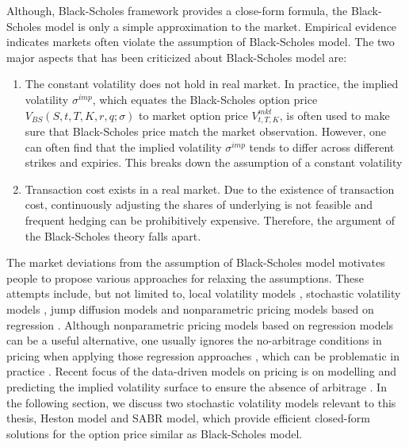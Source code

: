 \documentclass[letterpaper,12pt,titlepage,oneside,final]{book}
\numberwithin{equation}{section}
\theoremstyle{definition}
\begin{document}
Although, Black-Scholes framework provides a  close-form formula, the Black-Scholes model is only a simple approximation to the market. Empirical  evidence indicates markets often violate the assumption of   Black-Scholes model. The two major aspects that has been criticized about Black-Scholes model are:
\begin{enumerate}
\item The constant volatility does not hold in real market. In practice, the implied volatility $\sigma^{imp}$, which equates the Black-Scholes option price $V_{BS}(S,t,T,K,r,q;\sigma)$ to market option price $V^{mkt}_{t,T,K}$, is often used to make sure that Black-Scholes price match the market observation. However, one can often find that the implied volatility $\sigma^{imp}$ tends to differ across different strikes and expiries. This breaks down the assumption of a constant volatility
\item Transaction cost exists in a real market. Due to the existence of transaction cost, continuously adjusting the shares of underlying is not feasible and frequent hedging can be prohibitively expensive. Therefore, the argument of the Black-Scholes theory falls apart.
\end{enumerate}
The market deviations from the assumption of Black-Scholes model  motivates people to propose various approaches for relaxing the assumptions. These attempts include, but not limited to, local volatility models \citep{coleman2001,dumas1998implied,rubinstein1994implied,dupire1994pricing}, stochastic volatility models \cite{hagan2002managing,heston1993closed,hull1987pricing,bakshi1997empirical}, jump diffusion models \citep{He06,kou2002jump} and nonparametric pricing models based on regression \citep{yao2000option,bennell2004black,gradojevic2009option,garcia2000pricing,malliaris1993neural}. Although nonparametric pricing models based on regression models can be a useful alternative, one usually ignores the no-arbitrage conditions in pricing when applying those regression approaches \citep{yao2000option,bennell2004black,gradojevic2009option,garcia2000pricing,malliaris1993neural}, which can be problematic in practice \cite{itkin2019deep}. Recent focus of the data-driven models on pricing is on modelling and predicting the implied volatility surface to ensure the absence of arbitrage \cite{cao2021option,zheng2021incorporating,liu2019pricing}.
In the following section, we discuss two stochastic volatility models relevant to this thesis, Heston model and SABR model, which provide efficient closed-form solutions for the option price similar as Black-Scholes model.
\end{document}
